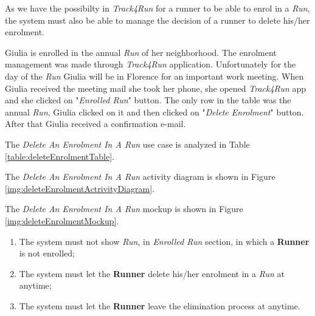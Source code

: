 As we have the possibilty in \textit{Track4Run} for a runner to be able to enrol in a \textit{Run}, the system must also be able to manage the decision of a runner to delete his/her enrolment.

Giulia is enrolled in the annual \textit{Run} of her neighborhood. The enrolment management was made through \textit{Track4Run} application. Unfortunately for the day of the \textit{Run} Giulia will be in Florence for an important work meeting.
When Giulia received the meeting mail she took her phone, she opened \textit{Track4Run} app and she clicked on "\textit{Enrolled Run}" button.
The only row in the table was the annual \textit{Run}, Giulia clicked on it and then clicked on "\textit{Delete Enrolment}" button.
After that Giulia received a confirmation e-mail.

The \textit{Delete An Enrolment In A Run} use case is analyzed in Table \ref{table:deleteEnrolmentTable}.

The \textit{Delete An Enrolment In A Run} activity diagram is shown in Figure \ref{img:deleteEnrolmentActrivityDiagram}.

The \textit{Delete An Enrolment In A Run} mockup is shown in Figure \ref{img:deleteEnrolmentMockup}.

\begin{enumerate}
  \item The system must not show \textit{Run}, in \textit{Enrolled Run} section, in which a \textbf{Runner} is not enrolled;
  \item The system must let the \textbf{Runner} delete his/her enrolment in a \textit{Run} at anytime;
  \item The system must let the \textbf{Runner} leave the elimination process at anytime.
\end{enumerate}

